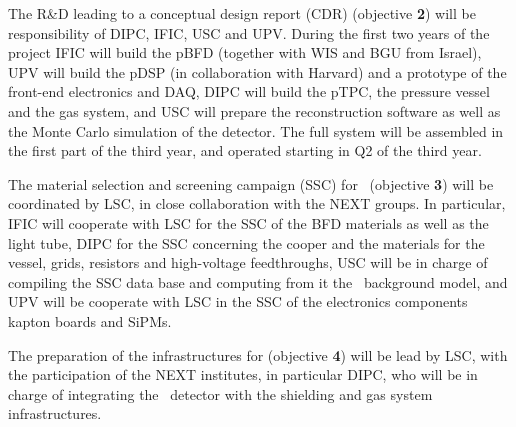 \indent

The R\&D leading to a conceptual design report (CDR) (objective {\bf 2}) will be responsibility of DIPC, IFIC, USC and UPV. 
During the first two years of the project IFIC will build the pBFD (together with WIS and BGU from Israel), UPV will build the pDSP (in collaboration with Harvard) and a prototype of the front-end electronics and DAQ, DIPC will build the pTPC, the pressure vessel and the gas system, and USC will prepare the reconstruction software as well as the Monte Carlo simulation of the detector. The full system will be assembled in the first part of the third year, and operated starting in Q2 of the third year.  

The material selection and screening campaign (SSC) for \NHD\ (objective {\bf 3})  will be coordinated by LSC, in close collaboration with the NEXT groups. In particular, IFIC will cooperate with LSC for the SSC of the BFD materials as well as the light tube, DIPC for the SSC concerning the cooper and the materials for the vessel, grids, resistors and high-voltage feedthroughs, USC will be in charge of compiling the SSC data base and computing from it the \NHD\ background model, and UPV will be cooperate with LSC in the SSC of the electronics components  kapton boards and SiPMs. 

The preparation of the infrastructures for \NHD (objective {\bf 4})  will be lead by LSC, with the participation of the NEXT institutes, in particular DIPC, who will be in charge of integrating the \NHD\ detector with the shielding and gas system infrastructures. 
  